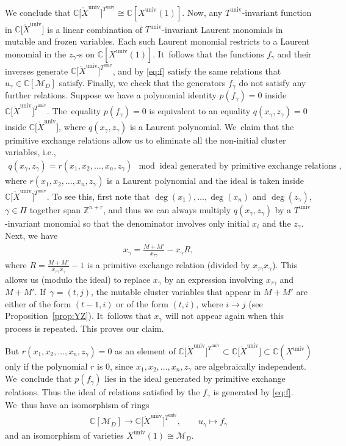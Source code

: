 \documentclass[10pt,a4paper]{amsart}
\def\C{{\mathbb C}}
\def\Z{{\mathbb Z}}
\def\Uo{{\mathring{U}}}
\def\Xo{{\mathring{X}}}
\def\univ{{\operatorname{univ}}}
\def\M{{\mathcal{M}}}
\numberwithin{equation}{section}
\begin{document}
We conclude that $\C\big[\Xo^\univ\big]^{T^\univ} \!\!\cong \C[X^\univ(1)]$. Now, any $T^\univ$-invariant function in $\C\big[\Xo^\univ\big]$ is a linear combination of $T^\univ$-invariant Laurent monomials in mutable and frozen variables. Each such Laurent monomial restricts to a Laurent monomial in the $z_\gamma$-s on $\C[X^\univ(1)]$. It~follows that the functions $f_\gamma$ and their inverses generate $\C\big[\Xo^\univ\big]^{T^\univ}$, and by \eqref{eq:f} satisfy the same relations that $u_\gamma \in \C[\M_D]$ satisfy. Finally, we check that the generators $f_\gamma$ do not satisfy any further relations. Suppose we have a polynomial identity $p(f_\gamma) = 0$ inside $\C\big[\Xo^\univ\big]^{T^\univ}$. The~equality $p(f_\gamma) = 0$ is equivalent to an equality $q(x_\gamma,z_\gamma) = 0$ inside $\C\big[\Xo^\univ\big]$, where $q(x_\gamma,z_\gamma)$ is a Laurent polynomial. We~claim that the primitive exchange relations allow us to eliminate all the non-initial cluster variables, i.e.,
\begin{gather*}
q(x_\gamma,z_\gamma) = r(x_1,x_2,\dots,x_n,z_\gamma) \mod \mbox{ ideal generated by primitive exchange relations},
\end{gather*}
where $r(x_1,x_2,\dots,x_n,z_\gamma)$ is a Laurent polynomial and the ideal is taken inside $\C\big[\Xo^\univ\big]^{T^\univ}$. To see this, first note that $\deg(x_1),\dots,\deg(x_n)$ and $\deg(z_\gamma)$, $\gamma \in \Pi$ together span $\Z^{n+r}$, and thus we can always multiply $q(x_\gamma,z_\gamma)$ by a $T^\univ$-invariant monomial so that the denominator involves only initial $x_i$ and the $z_\gamma$. Next, we have
\begin{gather*}
x_\gamma = \frac{M+M'}{x_{\tau \gamma}} - x_\gamma R,
\end{gather*}
where $R = \frac{M+M'}{x_{\tau \gamma} x_\gamma} - 1$ is a primitive exchange relation (divided by $x_{\tau \gamma} x_\gamma$). This allows us (modulo the ideal) to replace $x_\gamma$ by an expression involving $x_{\tau \gamma}$ and $M+M'$. If~$\gamma = (t,j)$, the mutable cluster variables that appear in $M+M'$ are either of the form $(t-1,i)$ or of the form $(t,i)$, where $i \to j$ (see Proposition~\ref{prop:YZ}). It~follows that $x_\gamma$ will not appear again when this process is repeated. This proves our claim.

But $r(x_1,x_2,\dots,x_n,z_\gamma) = 0$ as an element of $\C\big[\Xo^\univ\big]^{T^\univ} \subset \C\big[\Xo^\univ\big] \subset \C(X^\univ)$ only if the polynomial $r$ is 0, since $x_1,x_2,\dots,x_n,z_\gamma$ are algebraically independent. We~conclude that $p(f_\gamma)$ lies in the ideal generated by primitive exchange relations. Thus the ideal of relations satisfied by the $f_\gamma$ is generated by \eqref{eq:f}. We~thus have an isomorphism of rings
\begin{gather*}
\C[\M_D] \longrightarrow \C\big[\Xo^\univ\big]^{T^\univ}, \qquad u_\gamma \longmapsto f_\gamma
\end{gather*}
and an isomorphism of varieties $X^\univ(1) \cong \M_D$. %
\end{document}
